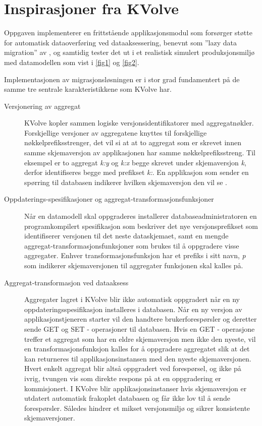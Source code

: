 \section{Inspirasjoner fra KVolve}

Oppgaven implementerer en frittstående applikasjonsmodul som forsørger støtte for automatisk dataoverføring ved dataaksessering, benevnt som ''lazy data migration'' av \cite{saur2016}, og samtidig tester det ut i et realistisk simulert produksjonsmiljø med datamodellen som vist i \ref{fig1} og \ref{fig2}.

Implementasjonen av migrasjonsløsningen er i stor grad fundamentert på de samme tre sentrale karakteristikkene som KVolve har.

\begin{description}
  \item [Versjonering av aggregat] KVolve kopler sammen logiske versjonsidentifikatorer med aggregatnøkler. Forskjellige versjoner av aggregatene knyttes til forskjellige nøkkelprefiksstrenger, det vil si at at to aggregat som er skrevet innen samme skjemaversjon av applikasjonen har samme nøkkelprefiksstreng. Til eksempel er to aggregat \emph{k:y} og \emph{k:x} begge skrevet under skjemaversjon \emph{k}, derfor identifiseres begge med prefikset \emph{k:}. En applikasjon som sender en spørring til databasen indikerer hvilken skjemaversjon den vil se \citep{saur2016}.
  \item [Oppdaterings-spesifikasjoner og aggregat-transformasjonsfunksjoner] Når en datamodell skal oppgraderes installerer databaseadministratoren en programkompilert spesifikasjon som beskriver det nye versjonsprefikset som identifiserer versjonen til det neste dataskjemaet, samt en mengde aggregat-transformasjonsfunksjoner som brukes til å oppgradere visse aggregater. Enhver transformasjonsfunksjon har et prefiks i sitt navn, \emph{p} som indikerer skjemaversjonen til aggregater funksjonen skal kalles på.
  \item [Aggregat-transformasjon ved dataaksess] Aggregater lagret i KVolve blir ikke automatisk oppgradert når en ny oppdateringsspesifikasjon installeres i databasen. Når en ny versjon av applikasjonstjeneren starter vil den handtere brukerforespørsler og deretter sende GET og SET - operasjoner til databasen. Hvis en GET - operasjone treffer et aggregat som har en eldre skjemaversjon men ikke den nyeste, vil en transformasjonsfunksjon kalles for å oppgradere aggregatet slik at det kan returneres til applikasjonsinstansen med den nyeste skjemaversjonen. Hvert enkelt aggregat blir altså oppgradert ved forespørsel, og ikke på ivrig, tvungen vis som direkte respons på at en oppgradering er kommisjonert. I KVolve blir applikasjonsinstanser hvis skjemaversjon er utdatert automatisk frakoplet databasen og får ikke lov til å sende forespørsler. Således hindrer \cite{saur2016} et mikset versjonsmiljø og sikrer konsistente skjemaversjoner.
\end{description}

